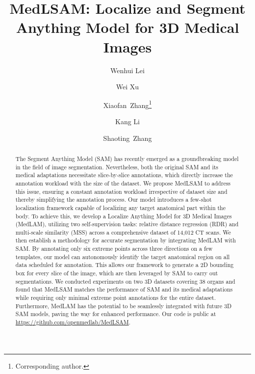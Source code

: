 \documentclass[a4paper]{llncs}
\begin{document}
\title{MedLSAM: Localize and Segment Anything Model for 3D Medical Images}

\author{Wenhui Lei\and Wei Xu \and Xiaofan~Zhang\thanks{Corresponding author.} \and Kang Li \and Shaoting~Zhang}
\maketitle

\begin{abstract}
The Segment Anything Model (SAM) has recently emerged as a groundbreaking model in the field of image segmentation. Nevertheless, both the original SAM and its medical adaptations necessitate slice-by-slice annotations, which directly increase the annotation workload with the size of the dataset. We propose MedLSAM to address this issue, ensuring a constant annotation workload irrespective of dataset size and thereby simplifying the annotation process. Our model introduces a few-shot localization framework capable of localizing any target anatomical part within the body. To achieve this, we develop a Localize Anything Model for 3D Medical Images (MedLAM), utilizing two self-supervision tasks: relative distance regression (RDR) and multi-scale similarity (MSS) across a comprehensive dataset of 14,012 CT scans. We then establish a methodology for accurate segmentation by integrating MedLAM with SAM. By annotating only six extreme points across three directions on a few templates, our model can autonomously identify the target anatomical region on all data scheduled for annotation. This allows our framework to generate a 2D bounding box for every slice of the image, which are then leveraged by SAM to carry out segmentations. We conducted experiments on two 3D datasets covering 38 organs and found that MedLSAM matches the performance of SAM and its medical adaptations while requiring only minimal extreme point annotations for the entire dataset. Furthermore, MedLAM has the potential to be seamlessly integrated with future 3D SAM models, paving the way for enhanced performance. Our code is public at \href{https://github.com/openmedlab/MedLSAM}{https://github.com/openmedlab/MedLSAM}.

\end{abstract}
\end{document}

